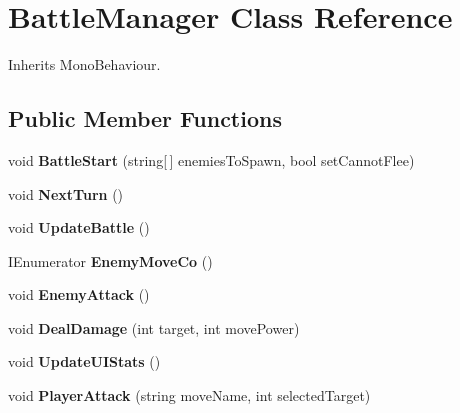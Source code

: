 \hypertarget{class_battle_manager}{}\section{Battle\+Manager Class Reference}
\label{class_battle_manager}


Inherits Mono\+Behaviour.

\subsection*{Public Member Functions}
\begin{DoxyCompactItemize}
\item 
\mbox{\label{class_battle_manager_a061a04704bc6c175e3b41a29e2d7680c}} 
void {\bfseries Battle\+Start} (string\mbox{[}$\,$\mbox{]} enemies\+To\+Spawn, bool set\+Cannot\+Flee)
\item 
\mbox{\label{class_battle_manager_a9377bfedc2c1003b4584dd02a3b87105}} 
void {\bfseries Next\+Turn} ()
\item 
\mbox{\label{class_battle_manager_a6da90533c0134cfcee0f034938fa3e1d}} 
void {\bfseries Update\+Battle} ()
\item 
\mbox{\label{class_battle_manager_a8ec394030d9fe63f4d2fa5e90faf5ebe}} 
I\+Enumerator {\bfseries Enemy\+Move\+Co} ()
\item 
\mbox{\label{class_battle_manager_a217b50a13bb8353504cff1e4ad8bef85}} 
void {\bfseries Enemy\+Attack} ()
\item 
\mbox{\label{class_battle_manager_a462ed7f04592719709ceb5b2280eabf6}} 
void {\bfseries Deal\+Damage} (int target, int move\+Power)
\item 
\mbox{\label{class_battle_manager_aa76a8a928215d9bd5ea33229ef6e57b5}} 
void {\bfseries Update\+U\+I\+Stats} ()
\item 
\mbox{\label{class_battle_manager_ae55eaa3d28c87ef5890d802430fbaa68}} 
void {\bfseries Player\+Attack} (string move\+Name, int selected\+Target)
\item 

\end{DoxyCompactItemize}
